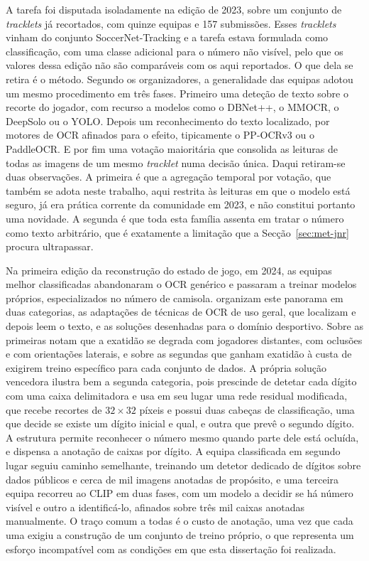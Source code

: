A tarefa foi disputada isoladamente na edição de 2023, sobre um conjunto de \emph{tracklets} já recortados, com quinze equipas e 157 submissões. Esses \emph{tracklets} vinham do conjunto SoccerNet-Tracking e a tarefa estava formulada como classificação, com uma classe adicional para o número não visível, pelo que os valores dessa edição não são comparáveis com os aqui reportados. O que dela se retira é o método. Segundo os organizadores, a generalidade das equipas adotou um mesmo procedimento em três fases. Primeiro uma deteção de texto sobre o recorte do jogador, com recurso a modelos como o DBNet++, o MMOCR, o DeepSolo ou o YOLO. Depois um reconhecimento do texto localizado, por motores de OCR afinados para o efeito, tipicamente o PP-OCRv3 ou o PaddleOCR. E por fim uma votação maioritária que consolida as leituras de todas as imagens de um mesmo \emph{tracklet} numa decisão única. Daqui retiram-se duas observações. A primeira é que a agregação temporal por votação, que também se adota neste trabalho, aqui restrita às leituras em que o modelo está seguro, já era prática corrente da comunidade em 2023, e não constitui portanto uma novidade. A segunda é que toda esta família assenta em tratar o número como texto arbitrário, que é exatamente a limitação que a Secção~\ref{sec:met-jnr} procura ultrapassar.

Na primeira edição da reconstrução do estado de jogo, em 2024, as equipas melhor classificadas abandonaram o OCR genérico e passaram a treinar modelos próprios, especializados no número de camisola. \citet{golovkin2025minimap} organizam este panorama em duas categorias, as adaptações de técnicas de OCR de uso geral, que localizam e depois leem o texto, e as soluções desenhadas para o domínio desportivo. Sobre as primeiras notam que a exatidão se degrada com jogadores distantes, com oclusões e com orientações laterais, e sobre as segundas que ganham exatidão à custa de exigirem treino específico para cada conjunto de dados. A própria solução vencedora ilustra bem a segunda categoria, pois prescinde de detetar cada dígito com uma caixa delimitadora e usa em seu lugar uma rede residual modificada, que recebe recortes de $32\times32$ píxeis e possui duas cabeças de classificação, uma que decide se existe um dígito inicial e qual, e outra que prevê o segundo dígito. A estrutura permite reconhecer o número mesmo quando parte dele está ocluída, e dispensa a anotação de caixas por dígito. A equipa classificada em segundo lugar seguiu caminho semelhante, treinando um detetor dedicado de dígitos sobre dados públicos e cerca de mil imagens anotadas de propósito, e uma terceira equipa recorreu ao CLIP em duas fases, com um modelo a decidir se há número visível e outro a identificá-lo, afinados sobre três mil caixas anotadas manualmente. O traço comum a todas é o custo de anotação, uma vez que cada uma exigiu a construção de um conjunto de treino próprio, o que representa um esforço incompatível com as condições em que esta dissertação foi realizada.

